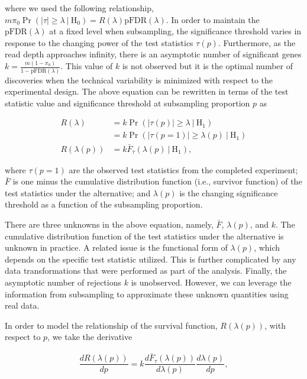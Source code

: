\documentclass[11pt]{article}
\begin{document}
\noindent where we used the following relationship, $m\pi_{0}\Pr\left(|\tau| \geq \lambda \:\big\vert\: \text{H}_{0}\right)= R(\lambda) \text{pFDR}(\lambda)$.
In order to maintain the $\text{pFDR}(\lambda)$ at a fixed level when subsampling, the significance threshold varies in response to the changing power of the test statistics $\tau(p)$. Furthermore, as the read depth approaches infinity, there is an asymptotic number of significant genes $k=\frac{m(1-\pi_{0})}{1-\text{pFDR}(\lambda)}$. This value of $k$ is not observed but it is the optimal number of discoveries when the technical variability is minimized with respect to the experimental design. The above equation can be rewritten in terms of the test statistic value and significance threshold at subsampling proportion $p$ as

\begin{equation}
\begin{aligned}
R(\lambda) &=  k\Pr\left(|\tau(p)| \geq \lambda\:\big\vert\: \text{H}_{1}\right)\\
&= k\Pr\left(|\tau(p=1)| \geq \lambda(p)\:\big\vert\: \text{H}_{1}\right)\\
R(\lambda(p))&=  k\bar{F}_{\tau}\left(\lambda(p)\:\big\vert\: \text{H}_{1}\right),
\end{aligned}
\end{equation}

\noindent where $\tau(p=1)$ are the observed test statistics from the completed experiment; $\bar{F}$ is one minus the cumulative distribution function (i.e., survivor function) of the test statistics under the alternative; and $\lambda(p)$ is the changing significance threshold as a function of the subsampling proportion. 

There are three unknowns in the above equation, namely, $\bar{F}$, $\lambda(p)$, and $k$. The cumulative distribution function of the test statistics under the alternative is unknown in practice. A related issue is the functional form of $\lambda(p)$, which depends on the specific test statistic utilized. This is further complicated by any data transformations that were performed as part of the analysis. Finally, the asymptotic number of rejections $k$ is unobserved. However, we can leverage the information from subsampling to approximate these unknown quantities using real data.

In order to model the relationship of the survival function, $R(\lambda(p))$, with respect to $p$, we take the derivative

$$
\begin{aligned}
\dfrac{dR(\lambda(p))}{dp} = k \dfrac{d\bar{F}_{\tau}(\lambda(p))}{d\lambda(p)} \dfrac{d\lambda(p)}{dp},
\end{aligned}
$$
\end{document}
